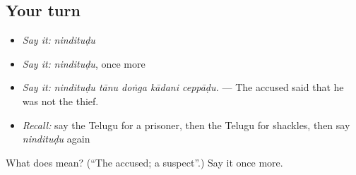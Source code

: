\subsection*{Your turn}
\begin{itemize}
\raggedright
  \item \emph{Say it:} \emph{nindituḍu}
  \item \emph{Say it:} \emph{nindituḍu}, once more
  \item \emph{Say it:} \emph{nindituḍu tānu doṅga kādani ceppāḍu.} — The accused said that he was not the thief.
  \item \emph{Recall:} say the Telugu for a prisoner, then the Telugu for shackles, then say \emph{nindituḍu} again
\end{itemize}

\begin{tcolorbox}[breakable,colback=teal!4,colframe=teal!35!black,title={Before you move on}]
What does  mean? (\textquotedblleft{}The accused; a suspect\textquotedblright{}.) Say it once more.
\end{tcolorbox}
